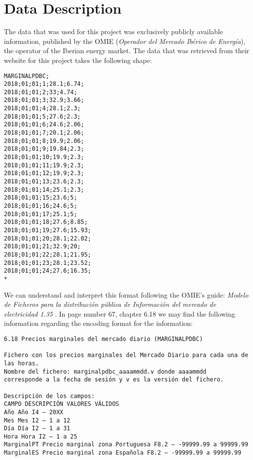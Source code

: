 \documentclass[12pt]{report} %
\begin{document}
\section{Data Description} %
The data that was used for this project was exclusively publicly available information, published by the OMIE (\textit{Operador del Mercado Ibérico de Energía}), the operator of the Iberian energy market. The data that was retrieved from their website \cite{omie_datos} for this project takes the following shape:

\begin{small}
\begin{verbatim}
MARGINALPDBC;
2018;01;01;1;28.1;6.74;
2018;01;01;2;33;4.74;
2018;01;01;3;32.9;3.66;
2018;01;01;4;28.1;2.3;
2018;01;01;5;27.6;2.3;
2018;01;01;6;24.6;2.06;
2018;01;01;7;20.1;2.06;
2018;01;01;8;19.9;2.06;
2018;01;01;9;19.84;2.3;
2018;01;01;10;19.9;2.3;
2018;01;01;11;19.9;2.3;
2018;01;01;12;19.9;2.3;
2018;01;01;13;23.6;2.3;
2018;01;01;14;25.1;2.3;
2018;01;01;15;23.6;5;
2018;01;01;16;24.6;5;
2018;01;01;17;25.1;5;
2018;01;01;18;27.6;8.85;
2018;01;01;19;27.6;15.93;
2018;01;01;20;28.1;22.02;
2018;01;01;21;32.9;20;
2018;01;01;22;28.1;21.95;
2018;01;01;23;28.1;23.52;
2018;01;01;24;27.6;16.35;
*
\end{verbatim}
\end{small}

We can understand and interpret this format following the OMIE's guide: \textit{Modelo de Ficheros para la distribución pública de Información del mercado de electricidad 1.35} \cite{omie_formatos_2024}. In page number 67, chapter 6.18 we may find the following information regarding the encoding format for the information:

\begin{small} %
\begin{verbatim}
6.18 Precios marginales del mercado diario (MARGINALPDBC)

Fichero con los precios marginales del Mercado Diario para cada una de
las horas.
Nombre del fichero: marginalpdbc_aaaammdd.v donde aaaammdd
corresponde a la fecha de sesión y v es la versión del fichero.

Descripción de los campos:
CAMPO DESCRIPCIÓN VALORES VÁLIDOS
Año Año I4 – 20XX
Mes Mes I2 – 1 a 12
Día Día I2 – 1 a 31
Hora Hora I2 – 1 a 25
MarginalPT Precio marginal zona Portuguesa F8.2 – -99999.99 a 99999.99
MarginalES Precio marginal zona Española F8.2 – -99999.99 a 99999.99
\end{verbatim}
\end{small}
\end{document}
